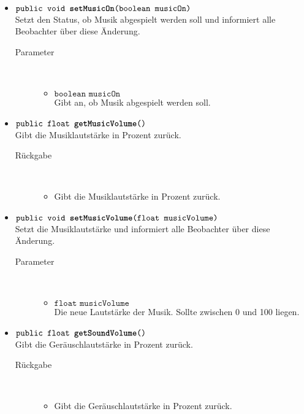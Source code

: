 \begin{description}
\begin{itemize}
		\item $\texttt{public void \textbf{setMusicOn}(boolean musicOn)}$ \\ Setzt den Status, ob Musik abgespielt werden soll und informiert alle Beobachter über diese Änderung.
		\begin{description}
			\item[Parameter] \hfill \\
			\vspace{-.8cm}
			\begin{itemize}
				\item $\texttt{boolean musicOn}$ \\ Gibt an, ob Musik abgespielt werden soll.
			\end{itemize}
		\end{description}
		
		\item $\texttt{public float \textbf{getMusicVolume}()}$ \\ Gibt die Musiklautstärke in Prozent zurück.
		\begin{description}
			\item[Rückgabe] \hfill \\
			\vspace{-.8cm}
			\begin{itemize}
				\item Gibt die Musiklautstärke in Prozent zurück.
			\end{itemize}
		\end{description}
		
		\item $\texttt{public void \textbf{setMusicVolume}(float musicVolume)}$ \\ Setzt die Musiklautstärke und informiert alle Beobachter über diese Änderung.
		\begin{description}
			\item[Parameter] \hfill \\
			\vspace{-.8cm}
			\begin{itemize}
				\item $\texttt{float musicVolume}$ \\ Die neue Lautstärke der Musik. Sollte zwischen 0 und 100 liegen.
			\end{itemize}
		\end{description}
		
		\item $\texttt{public float \textbf{getSoundVolume}()}$ \\ Gibt die Geräuschlautstärke in Prozent zurück.
		\begin{description}
			\item[Rückgabe] \hfill \\
			\vspace{-.8cm}
			\begin{itemize}
				\item Gibt die Geräuschlautstärke in Prozent zurück.
			\end{itemize}
		\end{description}
		

\end{itemize}
\end{description}
